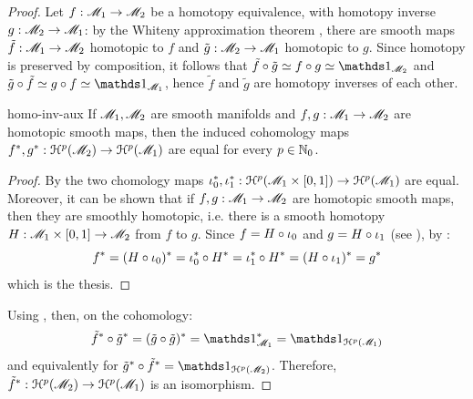 \begin{proofbox}
  \begin{proof}
    Let $ f : \mathscr{M}_1 \rightarrow \mathscr{M}_2 $ be a homotopy equivalence, with homotopy inverse $ g : \mathscr{M}_2 \rightarrow \mathscr{M}_1 $: by the Whiteny approximation theorem , there are smooth maps $ \tilde{f} : \mathscr{M}_1 \rightarrow \mathscr{M}_2 $ homotopic to $ f $ and $ \tilde{g} : \mathscr{M}_2 \rightarrow \mathscr{M}_1 $ homotopic to $ g $. Since homotopy is preserved by composition, it follows that $ \tilde{f} \circ \tilde{g} \homo f \circ g \homo \id_{\man_2} $ and $ \tilde{g} \circ \tilde{f} \homo g \circ f \homo \id_{\man_1} $, hence $ \tilde{f} $ and $ \tilde{g} $ are homotopy inverses of each other.

    \begin{lemma}{}{homo-inv-aux}
      If $ \mathscr{M}_1 , \mathscr{M}_2 $ are smooth manifolds and $ f,g : \mathscr{M}_1 \rightarrow \mathscr{M}_2 $ are homotopic smooth maps, then the induced cohomology maps $ f^* , g^* : \EuScript{H}^{p}(\mathscr{M}_2) \rightarrow \EuScript{H}^{p}(\mathscr{M}_1) $ are equal for every $ p \in \mathbb{N}_0 $.
    \end{lemma}

    \begin{proofbox}
      \begin{proof}
        By  the two chomology maps $ \iota_0^* , \iota_1^* : \EuScript{H}^{p}(\mathscr{M}_1 \times [0,1]) \rightarrow \EuScript{H}^{p}(\mathscr{M}_1) $ are equal. Moreover, it can be shown that if $ f , g : \mathscr{M}_1 \rightarrow \mathscr{M}_2 $ are homotopic smooth maps, then they are smoothly homotopic, i.e. there is a smooth homotopy $ H : \mathscr{M}_1 \times [0,1] \rightarrow \mathscr{M}_2 $ from $ f $ to $ g $. Since $ f = H \circ \iota_0 $ and $ g = H \circ \iota_1 $ (see ), by :
        \begin{equation*}
          f^* = (H \circ \iota_0)^* = \iota_0^* \circ H^* = \iota_1^* \circ H^* = (H \circ \iota_1)^* = g^*
        \end{equation*}
        which is the thesis.
      \end{proof}
    \end{proofbox}

    Using , then, on the cohomology:
    \begin{equation*}
      \tilde{f}^* \circ \tilde{g}^* = (\tilde{g} \circ \tilde{g})^* = \id_{\man_1}^* = \id_{\hp{p}(\man_1)}
    \end{equation*}
    and equivalently for $ \tilde{g}^* \circ \tilde{f}^* = \id_{\hp{p}(\man_2)} $. Therefore, $ \tilde{f}^* : \EuScript{H}^{p}(\mathscr{M}_2) \rightarrow \EuScript{H}^{p}(\mathscr{M}_1) $ is an isomorphism.
  \end{proof}
\end{proofbox}


